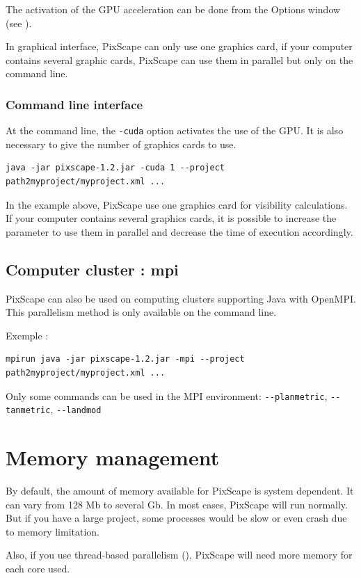 \documentclass{report}
\begin{document}
The activation of the GPU acceleration can be done from the Options window (see ).

In graphical interface, PixScape can only use one graphics card, if your computer contains several graphic cards, PixScape can use them in parallel but only on the command line.

\subsubsection{Command line interface}
At the command line, the \verb|-cuda| option activates the use of the GPU. It is also necessary to give the number of graphics cards to use.

\begin{Verbatim}
java -jar pixscape-1.2.jar -cuda 1 --project path2myproject/myproject.xml ...
\end{Verbatim}
In the example above, PixScape use one graphics card for visibility calculations. If your computer contains several graphics cards, it is possible to increase the parameter to use them in parallel and decrease the time of execution accordingly.


\subsection{Computer cluster : mpi}
PixScape can also be used on computing clusters supporting Java with OpenMPI. This parallelism method is only available on the command line.

Exemple :
\begin{Verbatim}
mpirun java -jar pixscape-1.2.jar -mpi --project path2myproject/myproject.xml ...
\end{Verbatim}
Only some commands can be used in the MPI environment: \verb|--planmetric|, \verb|--tanmetric|, \verb|--landmod|


\section{Memory management}
\label{memory}
By default, the amount of memory available for PixScape is system dependent.  It can vary from 128 Mb to several Gb.  In most cases, PixScape will run normally.  But if you have a large project, some processes would be slow or even crash due to memory limitation.

Also, if you use thread-based parallelism (), PixScape will need more memory for each core used.
\end{document}
